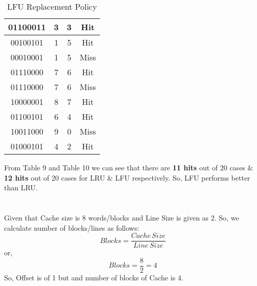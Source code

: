 \documentclass[12pt]{article}
\begin{document}
\begin{table}
\begin{tabular}{|c|c|c|c|}
\hline
01100011                                                                     & 3                  & 3                      & Hit                \\ 
\hline
00100101                                                                     & 1                  & 5                      & Hit                 \\ 
\hline
00010001                                                                     & 1                  & 5                      & Miss                \\ 
\hline
01110000                                                                     & 7                  & 6                      & Hit                 \\ 
\hline
01110000                                                                     & 7                  & 6                      & Miss                \\ 
\hline
10000001                                                                     & 8                  & 7                      & Hit                 \\ 
\hline
01100101                                                                     & 6                  & 4                      & Hit                 \\ 
\hline
10011000                                                                     & 9                  & 0                      & Miss                \\ 
\hline
01000101                                                                     & 4                  & 2                      & Hit                 \\
\hline
\end{tabular}
\caption{LFU Replacement Policy}
\end{table}


From Table 9 and Table 10 we can see that there are \textbf{11 hits} out of 20 cases \& \textbf{12 hits} out of 20 cases for LRU \& LFU respectively. So, LFU performs better than LRU.

\section{}
Given that Cache size is 8 words/blocks and Line Size is given as 2. So, we calculate number of blocks/lines as follows:
\begin{equation*}
    Blocks = \frac{Cache \, Size}{Line \, Size}
\end{equation*}
or,
\begin{equation*}
    Blocks = \frac{8}{2} = 4
\end{equation*}
So, Offset is of 1 but and number of blocks of Cache is 4. \\
\end{document}
